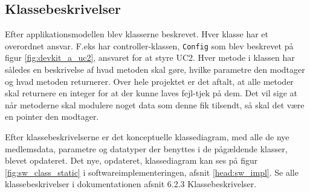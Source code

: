 \subsection{Klassebeskrivelser}

Efter applikationsmodellen blev klasserne beskrevet. Hver klasse har et overordnet ansvar. F.eks har controller-klassen, \verb+Config+ som blev beskrevet på figur \ref{fig:devkit_a_uc2}, ansvaret for at styre UC2. Hver metode i klassen har således en beskrivelse af hvad metoden skal gøre, hvilke parametre den modtager og hvad metoden returnerer. Over hele projektet er det aftalt, at alle metoder skal returnere en integer for at der kunne laves fejl-tjek på dem. Det vil sige at når metoderne skal modulere noget data som denne fik tilsendt, så skal det være en pointer den modtager.

Efter klassebeskrivelserne er det konceptuelle klassediagram, med alle de nye medlemsdata, parametre og datatyper der benyttes i de pågældende klasser, blevet opdateret. Det nye, opdateret, klassediagram kan ses på figur \ref{fig:sw_class_static} i softwareimplementeringen, afsnit \ref{head:sw_impl}. Se alle klassebeskrivelser i dokumentationen afsnit 6.2.3 Klassebeskrivelser.

